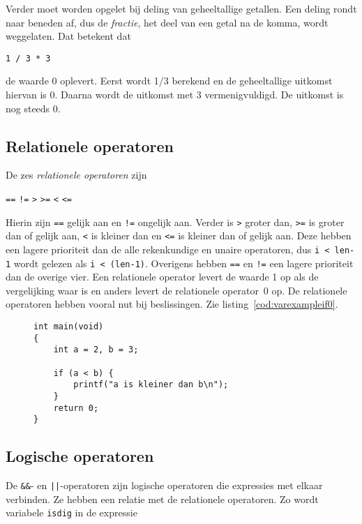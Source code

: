 Verder moet worden opgelet bij deling van geheeltallige getallen. Een deling rondt naar beneden af, dus de \textsl{fractie}, het deel van een getal na de komma, wordt weggelaten. Dat betekent dat

\hspace*{1em}\texttt{1 / 3 * 3}

de waarde 0 oplevert. Eerst wordt 1/3 berekend en de geheeltallige uitkomst hiervan is 0. Daarna wordt de uitkomst met 3 vermenigvuldigd. De uitkomst is nog steeds 0.

\subsection{Relationele operatoren}
De zes \textsl{relationele operatoren} zijn

\hspace*{1em}\texttt{==} \quad \texttt{!=} \quad \texttt{>} \quad \texttt{>=} \quad \texttt{<} \quad \texttt{<=}

\indexop{==}\indexop{>}\indexop{>=}\indexop{<}\indexop{<=}
Hierin zijn \texttt{==} gelijk aan en \texttt{!=} ongelijk aan. Verder is \texttt{>} groter dan, \texttt{>=} is groter dan of gelijk aan, \texttt{<} is kleiner dan en \texttt{<=} is kleiner dan of gelijk aan. Deze hebben een lagere prioriteit dan de alle rekenkundige en unaire operatoren, dus \texttt{i < len-1} wordt gelezen als \texttt{i < (len-1)}. Overigens hebben \texttt{==} en \texttt{!=} een lagere prioriteit dan de overige vier. Een relationele operator levert de waarde 1 op als de vergelijking waar is en anders levert de relationele operator~0 op.
De relationele operatoren hebben vooral nut bij beslissingen. Zie listing~\ref{cod:varexampleif0}.

\begin{figure}[H]
\begin{lstlisting}[caption=Voorbeeld van een beslissing.,label=cod:varexampleif0]
int main(void)
{
    int a = 2, b = 3;

    if (a < b) {
        printf("a is kleiner dan b\n");
    }
    return 0;
}
\end{lstlisting}
\end{figure}

\subsection{Logische operatoren}
De \texttt{\&\&}- en \texttt{||}-operatoren zijn logische operatoren die expressies met elkaar verbinden. Ze hebben een relatie met de relationele operatoren. Zo wordt variabele \texttt{isdig} in de expressie

